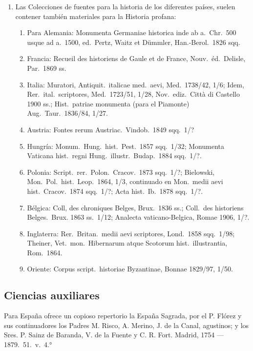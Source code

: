 \raggedbottom{} \documentclass[12pt, a4paper, openany]{book} %
\begin{document}
\begin{enumerate}
\begin{enumerate}
        \end{enumerate}
  \item Las Colecciones de fuentes para la historia de los diferentes países, suelen contener también materiales para la Historia profana:\begin{enumerate}
          \item Para Alemania: Monumenta Germaniae historica inde ab a.\ Chr.\ 500 usque ad a.\ 1500, ed.\ Pertz, Waitz et Dümmler, Han.-Berol.\ 1826 sqq.
          \item Francia: Recueil des historiens de Gaule et de France, Nouv.\ éd.\ Delisle, Par.\ 1869 ss.
          \item Italia: Muratori, Antiquit.\ italicae med.\ aevi, Med.\ 1738/42, 1/6; Idem, Rer.\ ital.\ scriptores, Med.\ 1723/51, 1/28, Nov.\ ediz.\ Città di Castello 1900 ss.; Hist.\ patriae monumenta (para el Piamonte) Aug.\ Taur.\ 1836/84, 1/27.
          \item Austria: Fontes rerum Austriac.\ Vindob.\ 1849 sqq.\ 1/?
          \item Hungría: Monum.\ Hung.\ hist.\ Pest.\ 1857 sqq.\ 1/32; Monumenta Vaticana hist.\ regni Hung.\ illustr.\ Budap.\ 1884 sqq.\ 1/?.
          \item Polonia: Script.\ rer.\ Polon.\ Cracov.\ 1873 sqq.\ 1/?; Bielowski, Mon.\ Pol.\ hist.\ Leop.\ 1864, 1/3, continuado en Mon.\ medii aevi hist.\ Cracov.\ 1874 sqq.\ 1/?; Acta hist.\ Ib.\ 1878 sqq.\ 1/?.
          \item Bélgica: Coll, des chroniques Belges, Brux.\ 1836 ss.; Coll.\ des historiens Belges.\ Brux. 1863 ss.\ 1/12; Analecta vaticano-Belgica, Romae 1906, 1/?.
          \item Inglaterra: Rer.\ Britan.\ medii aevi scriptores, Lond.\ 1858 sqq.\ 1/98; Theiner, Vet.\ mon.\ Hibernarum atque Scotorum hist.\ illustrantia, Rom.\ 1864.
          \item Oriente: Corpus script.\ historiae Byzantinae, Bonnae 1829/97, 1/50.
        \end{enumerate}
\end{enumerate}

\subsection{Ciencias auxiliares} Para España ofrece un copioso repertorio la España Sagrada, por el P. Flórez y sus continuadores los Padres M. Risco, A. Merino, J. de la Canal, agustinos; y los Sres. P. Sainz de Baranda, V. de la Fuente y C. R. Fort. Madrid, 1754 --- 1879.\ 51.\ v.\ 4.°
\end{document}

